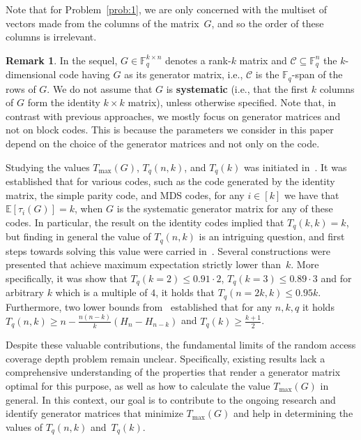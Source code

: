 \documentclass[11pt,a4paper,reqno,twoside]{amsart}
\theoremstyle{definition}
\newtheorem{remark}{Remark}
\newcommand{\F}{\mathbb{F}}
\newcommand{\E}{\mathbb{E}}
\newcommand{\mC}{\mathcal{C}}
\newcommand{\tmax}{T_{\max}}
\begin{document}
Note that for Problem~\ref{prob:1}, we are only concerned with the multiset of vectors made from the columns of the matrix~$G$, and so the order of these columns is irrelevant.

\begin{remark}
    In the sequel, $G \in \F_q^{k \times n}$ denotes a rank-$k$ matrix and $\mC \subseteq \F_q^n$ the $k$-dimensional code having $G$ as its generator matrix, i.e., $\mC$ is the $\F_q$-span of the rows of $G$. We do not assume that $G$ is \textbf{systematic} (i.e., that the first $k$ columns of $G$ form the identity $k \times k$ matrix), unless otherwise specified.
    Note that, in contrast with previous approaches, we mostly focus on generator matrices and not on block codes. This is because the parameters we consider in this paper depend on the choice of the generator matrices and not only on the code.  
\end{remark}

Studying the values $\tmax(G)$, $T_q(n,k)$, and $T_q(k)$ was initiated in~\cite{bar2023cover}. It was established that for various codes, such as the code generated by the identity matrix, the simple parity code, and MDS codes, %
for any $i\in[k]$ we have that $\E[\tau_i(G)] = k$, when $G$ is the systematic generator matrix for any of these codes. In particular, the result on the identity codes implied that $T_q(k,k)=k$, but finding in general the value of $T_q(n,k)$ is an intriguing question, and first steps towards solving this value were carried in~\cite{bar2023cover}. Several constructions were presented that achieve maximum expectation strictly lower than~$k$. More specifically, it was show that $T_q(k=2)\leq 0.91\cdot 2$, $T_q(k=3)\leq 0.89\cdot 3$ and for arbitrary $k$ which is a multiple of $4$, it holds that $T_q(n=2k,k) \leq 0.95k$. Furthermore, two lower bounds from~\cite{bar2023cover} established that for any $n,k,q$ it holds $T_q(n,k) \geq n - \frac{n(n-k)}{k} (H_n-H_{n-k})$ and $T_q(k) \geq \frac{k+1}{2}$.



Despite these valuable contributions, the fundamental limits of the random access coverage depth problem remain unclear. 
Specifically, existing results lack a comprehensive understanding of the properties that render a generator matrix optimal for this purpose, as well as how to calculate the value $\tmax(G)$ in general. In this context, our goal is to contribute to the ongoing research and identify generator matrices that minimize $\tmax(G)$ and help in determining the values of $T_q(n,k)$ and~$T_q(k)$.
\end{document}
